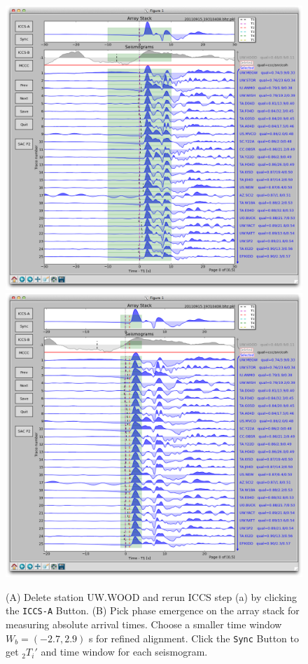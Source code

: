 \documentclass[12pt, titlepage]{article}
\begin{document}
\begin{figure}[!h]
    \centering
    \includegraphics[width = 0.494 \textwidth]{figs/snapshots/ttpick-r1-s1-rerun.png}
    \includegraphics[width = 0.494 \textwidth]{figs/snapshots/ttpick-r1-s1-sync.png}
    \caption{
    (A) Delete station UW.WOOD and rerun ICCS step (a) by clicking the \texttt{ICCS-A} Button.
    (B) Pick phase emergence on the array stack for measuring absolute arrival times. Choose a smaller time window $W_b=(-2.7, 2.9)$ s for refined alignment. Click the \texttt{Sync} Button to get $_2T_i'$ and time window for each seismogram.
    }
    \label{fig:ttpick1}
\end{figure}
\end{document}
